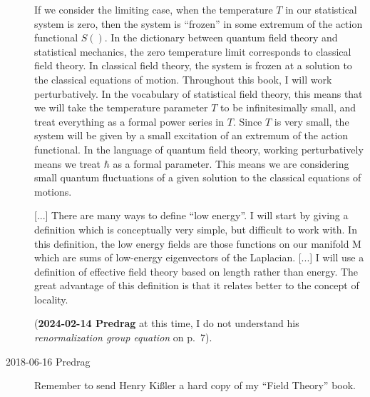\begin{description}
If we consider the limiting case, when the temperature $T$ in our statistical
system is zero, then the system is ``frozen'' in some extremum of the
action functional $S( )$. In the dictionary between quantum field theory and
statistical mechanics, the zero temperature limit corresponds to classical
field theory. In classical field theory, the system is frozen at a solution to
the classical equations of motion.
Throughout this book, I will work perturbatively. In the vocabulary
of statistical field theory, this means that we will take the temperature
parameter $T$ to be infinitesimally small, and treat everything as a formal
power series in $T$. Since $T$ is very small, the system will be given by a small
excitation of an extremum of the action functional.
In the language of quantum field theory, working perturbatively means
we treat $\hbar$ as a formal parameter. This means we are considering small
quantum fluctuations of a given solution to the classical equations of motions.

[...]
There are many ways to define ``low energy''. I will start by giving a
definition which is conceptually very simple, but difficult to work with. In
this definition, the low energy fields are those functions on our manifold M
which are sums of low-energy eigenvectors of the Laplacian.
[...]
I will use a definition of effective field theory
based on length rather than energy. The great advantage of this definition
is that it relates better to the concept of locality.

(\textbf{2024-02-14 Predrag} at this time, I do not understand his
\emph{renormalization group equation} on p.~7).

\bigskip

\item[2018-06-16 Predrag]
Remember to send Henry Ki{\ss}ler a hard copy of my ``Field Theory''
book.


\end{description}


\printbibliography[heading=subbibintoc,title={References}]
